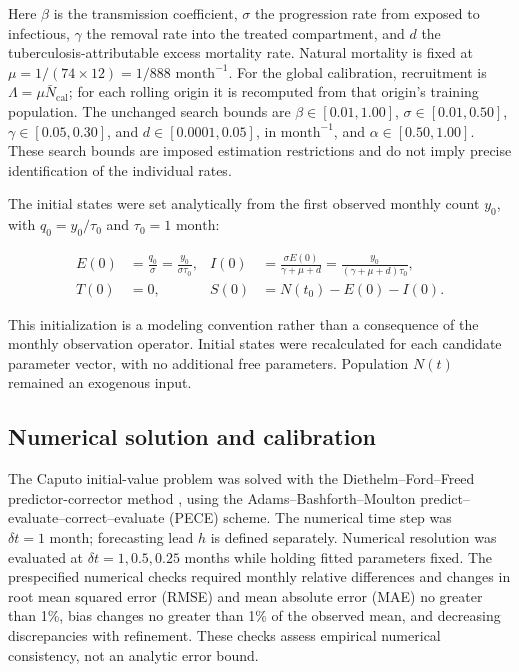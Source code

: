 \documentclass[pdflatex,sn-mathphys-ay]{sn-jnl}
\begin{document}
Here $\beta$ is the transmission coefficient, $\sigma$ the progression rate from exposed to infectious, $\gamma$ the removal rate into the treated compartment, and $d$ the tuberculosis-attributable excess mortality rate. Natural mortality is fixed at $\mu=1/(74\times12)=1/888\text{ month}^{-1}$. For the global calibration, recruitment is $\Lambda=\mu\bar N_{\mathrm{cal}}$; for each rolling origin it is recomputed from that origin's training population. The unchanged search bounds are $\beta\in[0.01,1.00]$, $\sigma\in[0.01,0.50]$, $\gamma\in[0.05,0.30]$, and $d\in[0.0001,0.05]$, in $\text{month}^{-1}$, and $\alpha\in[0.50,1.00]$. These search bounds are imposed estimation restrictions and do not imply precise identification of the individual rates.

The initial states were set analytically from the first observed monthly count $y_0$, with $q_0=y_0/\tau_0$ and $\tau_0=1\text{ month}$:

\[
\begin{aligned}
E(0)&=\frac{q_0}{\sigma}=\frac{y_0}{\sigma\tau_0}, &
I(0)&=\frac{\sigma E(0)}{\gamma+\mu+d}=\frac{y_0}{(\gamma+\mu+d)\tau_0},\\
T(0)&=0, & S(0)&=N(t_0)-E(0)-I(0).
\end{aligned}
\]

This initialization is a modeling convention rather than a consequence of the monthly observation operator. Initial states were recalculated for each candidate parameter vector, with no additional free parameters. Population $N(t)$ remained an exogenous input.

\subsection{Numerical solution and calibration}

The Caputo initial-value problem was solved with the Diethelm--Ford--Freed predictor-corrector method \citep{diethelm2002}, using the Adams--Bashforth--Moulton predict--evaluate--correct--evaluate (PECE) scheme. The numerical time step was $\delta t=1\text{ month}$; forecasting lead $h$ is defined separately. Numerical resolution was evaluated at $\delta t=1,0.5,0.25$ months while holding fitted parameters fixed. The prespecified numerical checks required monthly relative differences and changes in root mean squared error (RMSE) and mean absolute error (MAE) no greater than 1\%, bias changes no greater than 1\% of the observed mean, and decreasing discrepancies with refinement. These checks assess empirical numerical consistency, not an analytic error bound.
\end{document}
